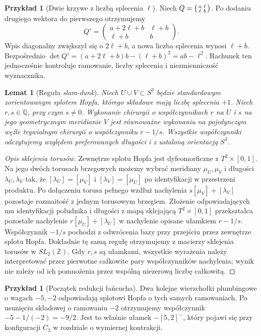 \documentclass[11pt,a4paper]{report}
\numberwithin{equation}{section}
\theoremstyle{plain}
\newtheorem{lemat}[twierdzenie]{Lemat}
\theoremstyle{definition}
\newtheorem{przyklad}[twierdzenie]{Przykład}
\theoremstyle{remark}
\begin{document}
\begin{przyklad}[Dwie krzywe z liczbą splecenia $\ell$]
Niech $Q=\begin{psmallmatrix}a&\ell\\\ell&b\end{psmallmatrix}$.
Po dodaniu drugiego wektora do pierwszego otrzymujemy
\[
Q'=\begin{pmatrix}a+2\ell+b&\ell+b\\\ell+b&b\end{pmatrix}.
\]
Wpis diagonalny zwiększył się o $2\ell+b$,
a nowa liczba splecenia wynosi $\ell+b$.
Bezpośrednio
$\det Q'=(a+2\ell+b)b-(\ell+b)^2=ab-\ell^2$.
Rachunek ten jednocześnie kontroluje ramowanie,
liczby splecenia i niezmienniczość wyznacznika.
\end{przyklad}

\begin{lemat}[Reguła \emph{slam-dunk}]
\label{lem:tg-kirby-slam-dunk}
Niech $U\cup V\subset S^3$ będzie standardowym zorientowanym
splotem Hopfa, którego składowe mają liczbę splecenia $+1$.
Niech $r,s\in\mathbb Q$, przy czym $s\ne0$.
Wykonanie chirurgii o współczynnikach $r$ na $U$
i $s$ na jego geometrycznym meridianie $V$ jest
równoważne wykonaniu na pojedynczym węźle trywialnym
chirurgii o współczynniku $r-1/s$. Wszystkie
współczynniki odczytujemy względem preferowanych
długości i z ustaloną orientacją $S^3$.
\end{lemat}
\begin{proof}[Opis sklejenia torusów]
Zewnętrze splotu Hopfa jest dyfeomorficzne
z $T^2\times[0,1]$. Na jego dwóch torusach brzegowych
możemy wybrać meridiany $\mu_U,\mu_V$ i długości
$\lambda_U,\lambda_V$ tak, że
$[\lambda_U]=[\mu_V]$ i $[\lambda_V]=[\mu_U]$
po identyfikacji w przestrzeni produktu.
Po dołączeniu torusa pełnego wzdłuż nachylenia
$s[\mu_V]+[\lambda_V]$ pozostaje rozmaitość
z jednym torusowym brzegiem. Złożenie odpowiadających
mu identyfikacji południka i długości z mapą sklejającą
$T^2\times[0,1]$ przekształca pozostałe nachylenie
$r[\mu_U]+[\lambda_U]$ w nachylenie opisane
ułamkiem $r-1/s$. Współczynnik $-1/s$ pochodzi
z odwrócenia bazy przy przejściu przez zewnętrze
splotu Hopfa. Dokładnie tę samą regułę otrzymujemy
z macierzy sklejenia torusów w $SL_2(\mathbb Z)$.
Gdy $r,s$ są ułamkami, wszystkie wyrażenia należy
interpretować przez pierwotne całkowite pary
współczynników nachylenia; wynik nie zależy od ich
pomnożenia przez wspólną niezerową liczbę całkowitą.
\end{proof}

\begin{przyklad}[Początek redukcji łańcucha]
Dwa kolejne wierzchołki plumbingowe o wagach
$-5,-2$ odpowiadają splotowi Hopfa o tych samych
ramowaniach. Po usunięciu składowej o ramowaniu
$-2$ otrzymujemy współczynnik
$-5-1/(-2)=-9/2$. Jest to właśnie ułamek
$-[5,2]^-$, który pojawi się przy konfiguracji
$C_3$ w rozdziale o wymiernej kontrakcji.
\end{przyklad}
\end{document}
